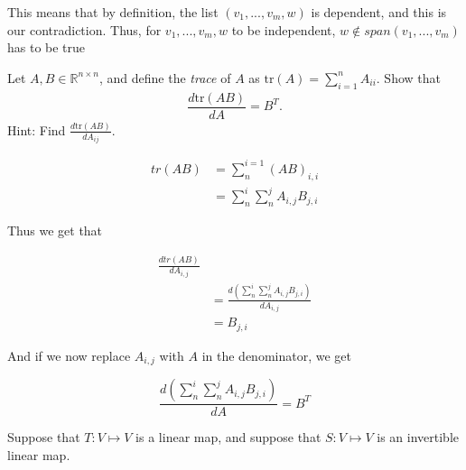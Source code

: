 \documentclass[12pt,A4, onecolumn]{exam}
\begin{document}
\begin{questions}
\begin{solution}
    This means that by definition, the list $ (v_1, ..., v_m, w) $ is dependent, and this is our contradiction.
    Thus, for $ v_1, ..., v_m, w $ to be independent, $ w \notin span(v_1, ..., v_m)$ has to be true  

  \end{solution}

  \question[10] Let $A,B\in \mathbb{R}^{n\times n}$, and define the \emph{trace} of $A$ as $\mathrm{tr}(A)=\sum_{i=1}^n A_{ii}$. Show that 
    \begin{align}
      \dfrac{d \mathrm{tr}(AB)}{dA} = B^T.
    \end{align}
    Hint: Find $\frac{d\mathrm{tr}(AB)}{dA_{ij}}$.


    \begin{solution}
      \begin{align*}
        tr(AB) &= \sum_{ n }^{ i=1 } (AB)_{i, i} \\
        &= \sum_{ n }^{ i } \sum_{ n }^{ j } A_{i, j}B_{j, i}
      \end{align*}

      Thus we get that  

      \begin{align*}
        \frac{dtr(AB)} {dA_{i,j}} \\
        &= \frac{d(\sum_{ n }^{ i } \sum_{ n }^{ j } A_{i, j} B_{j, i})} {dA_{i, j}} \\ 
        &= B_{j, i}
      \end{align*}

      And if we now replace $ A_{i, j} $ with $ A $ in the denominator, we get
      
      \[
         \frac{d(\sum_{ n }^{ i } \sum_{ n }^{ j } A_{i, j} B_{j, i})} {dA} = B^T
      \] 
      
    \end{solution}

  \question[15] Suppose that $T:V\mapsto V$ is a linear map, and suppose that $S:V\mapsto V$ is an invertible linear map.
\end{questions}
\end{document}
